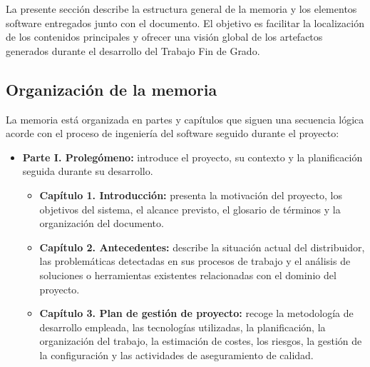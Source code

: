 La presente sección describe la estructura general de la memoria y los elementos software entregados junto con el documento. El objetivo es facilitar la localización de los contenidos principales y ofrecer una visión global de los artefactos generados durante el desarrollo del Trabajo Fin de Grado.

\subsection{Organización de la memoria}

La memoria está organizada en partes y capítulos que siguen una secuencia lógica acorde con el proceso de ingeniería del software seguido durante el proyecto:

\begin{itemize}
    \item \textbf{Parte I. Prolegómeno:} introduce el proyecto, su contexto y la planificación seguida durante su desarrollo.
          \begin{itemize}
              \item \textbf{Capítulo 1. Introducción:} presenta la motivación del proyecto, los objetivos del sistema, el alcance previsto, el glosario de términos y la organización del documento.
              \item \textbf{Capítulo 2. Antecedentes:} describe la situación actual del distribuidor, las problemáticas detectadas en sus procesos de trabajo y el análisis de soluciones o herramientas existentes relacionadas con el dominio del proyecto.
              \item \textbf{Capítulo 3. Plan de gestión de proyecto:} recoge la metodología de desarrollo empleada, las tecnologías utilizadas, la planificación, la organización del trabajo, la estimación de costes, los riesgos, la gestión de la configuración y las actividades de aseguramiento de calidad.
          \end{itemize}


\end{itemize}
